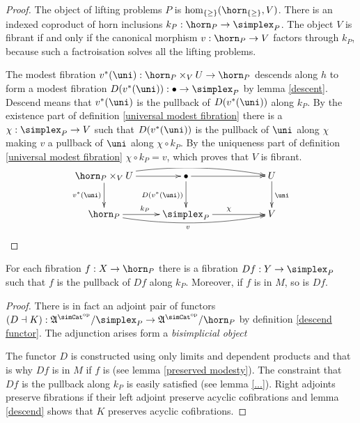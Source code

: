 \documentclass[csh.tex]{subfiles}
\begin{document}
\begin{proof} 
The object of lifting problems $P$ is $\hom_{\set\geq}(\horn_{\set\geq},V)$. There is an indexed coproduct of horn inclusions $k_P\of \horn_P\to\simplex_P$. The object $V$ is fibrant if and only if the canonical morphism $v\of\horn_P\to V$ factors through $k_P$, because such a factroisation solves all the lifting problems.

The modest fibration $v\ri(\uni)\of \horn_P\times_V U \to \horn_P$ descends along $h$ to form a modest fibration $D(v\ri(\uni))\of \bullet\to\simplex_P$ by lemma \ref{descent}. Descend means that $v\ri(\uni)$ is the pullback of $D(v\ri(\uni))$ along $k_P$.
By the existence part of definition \ref{universal modest fibration} there is a $\chi\of\simplex_P\to V$ such that $D(v\ri(\uni))$ is the pullback of $\uni$ along $\chi$ making $v$ a pullback of $\uni$ along $\chi\circ k_P$. By the uniqueness part of definition \ref{universal modest fibration} $\chi\circ k_P=v$, which proves that $V$ is fibrant.
\[\xymatrix{
\horn_P\times_V U \ar@/^2ex/[rrr] \ar[r]\ar[d]_{v\ri(\uni)} & \bullet \ar[rr]\ar[d]_{D(v\ri(\uni))} && U\ar[d]^\uni\\
\horn_P\ar@/_2ex/[rrr]_v\ar[r]^{k_P} & \simplex_P\ar[rr]^{\chi} && V
}\]
\end{proof}

\begin{lemma}
For each fibration $f\of X\to \horn_P$ there is a fibration $Df\of Y\to\simplex_P$ such that $f$ is the pullback of $Df$ along $k_P$. Moreover, if $f$ is in $M$, so is $Df$.  \label{descent}
\end{lemma}

\newcommand\dsum[1]{\Sigma_{#1}}
\begin{proof}
There is in fact an adjoint pair of functors $(D\dashv K)\of\ambient\s/\simplex_P\to\ambient\s/\horn_P$ by definition \ref{descend functor}.
The adjunction arises form a \emph{bisimplicial object} %

The functor $D$ is constructed using only limits and dependent products and that is why $Df$ is in $M$ if $f$ is (see lemma \ref{preserved modesty}).
The constraint that $Df$ is the pullback along $k_P$ is easily satisfied (see lemma \ref{...}).
Right adjoints preserve fibrations if their left adjoint preserve acyclic cofibrations and lemma \ref{descend} shows that $K$ preserves acyclic cofibrations.

\end{proof}
\end{document}
